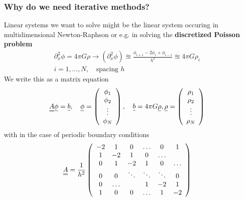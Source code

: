 \subsubsection*{Why do we need iterative methods?}
Linear systems we want to solve might be the linear system occuring
in multidimensional Newton-Raphson or e.g. in solving
the \textbf{discretized Poisson problem}
\begin{equation}
    \begin{gathered}
        \partial_x^2 \phi = 4\pi G \rho \rightarrow (\partial_x^2\phi) \approxeq \frac{\phi_{i+1} - 2\phi_i + \phi_{i-1}}{h^2}  \approxeq  4\pi G \rho_i \\
        i = 1,\dots,N, \quad \text{spacing } h
    \end{gathered}
\end{equation}
We write this as a matrix equation
\begin{equation}
    \mat{A} \vec{\phi} = \vec{b}, \quad \vec{\phi} = \left( \begin{array}{c} \phi_1 \\ \phi_2 \\ \vdots \\ \phi_N \end{array} \right), \quad \vec{b} = 4\pi G \vec{\rho}, \vec{\rho} = \left( \begin{array}{c} \rho_1 \\ \rho_2 \\ \vdots \\ \rho_N \end{array} \right)
\end{equation}
with in the case of periodic boundary conditions
\begin{equation}
    \mat{A} = \frac{1}{h^2} \left( \begin{array}{cccccc}
            -2 & 1 & 0 & \dots & 0 & 1 \\
            1 & -2 & 1 & 0 & \dots &  \\
            0 & 1 & -2 & 1 & 0 & \dots \\
            0 & 0 & \ddots & \ddots & \ddots & 0 \\
            0 & \dots &  & 1 & -2 & 1 \\
            1 & 0 & 0 & \dots & 1 & -2
        \end{array} \right)
\end{equation}


